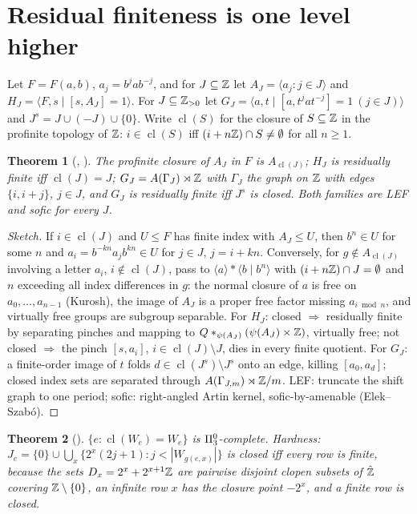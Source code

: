 \documentclass[11pt]{article}
\newtheorem{theorem}{Theorem}[section]
\theoremstyle{definition}
\newcommand{\cl}{\operatorname{cl}}
\begin{document}
\section{Residual finiteness is one level higher}
Let $F=F(a,b)$, $a_j=b^jab^{-j}$, and for $J\subseteq\mathbb Z$ let $A_J=\langle a_j:j\in J\rangle$ and $H_J=\langle F,s\mid [s,A_J]=1\rangle$. For $J\subseteq\mathbb Z_{>0}$ let $G_J=\langle a,t\mid [a,t^jat^{-j}]=1\ (j\in J)\rangle$ and $J^s=J\cup(-J)\cup\{0\}$. Write $\cl(S)$ for the closure of $S\subseteq\mathbb Z$ in the profinite topology of $\mathbb Z$: $i\in\cl(S)$ iff $(i+n\mathbb Z)\cap S\ne\emptyset$ for all $n\ge1$.
\begin{theorem}[, ]\label{thm:crit}
The profinite closure of $A_J$ in $F$ is $A_{\cl(J)}$; $H_J$ is residually finite iff $\cl(J)=J$; $G_J=A(\Gamma_J)\rtimes\mathbb Z$ with $\Gamma_J$ the graph on $\mathbb Z$ with edges $\{i,i+j\}$, $j\in J$, and $G_J$ is residually finite iff $J^s$ is closed. Both families are LEF and sofic for every $J$.
\end{theorem}
\begin{proof}[Sketch]
If $i\in\cl(J)$ and $U\le F$ has finite index with $A_J\le U$, then $b^n\in U$ for some $n$ and $a_i=b^{-kn}a_jb^{kn}\in U$ for $j\in J$, $j=i+kn$. Conversely, for $g\notin A_{\cl(J)}$ involving a letter $a_i$, $i\notin\cl(J)$, pass to $\langle a\rangle*\langle b\mid b^n\rangle$ with $(i+n\mathbb Z)\cap J=\emptyset$ and $n$ exceeding all index differences in $g$: the normal closure of $a$ is free on $a_0,\dots,a_{n-1}$ (Kurosh), the image of $A_J$ is a proper free factor missing $a_{i\bmod n}$, and virtually free groups are subgroup separable. For $H_J$: closed $\Rightarrow$ residually finite by separating pinches and mapping to $Q*_{\psi(A_J)}(\psi(A_J)\times\mathbb Z)$, virtually free; not closed $\Rightarrow$ the pinch $[s,a_i]$, $i\in\cl(J)\setminus J$, dies in every finite quotient. For $G_J$: a finite-order image of $t$ folds $d\in\cl(J^s)\setminus J^s$ onto an edge, killing $[a_0,a_d]$; closed index sets are separated through $A(\Gamma_{J,m})\rtimes\mathbb Z/m$. LEF: truncate the shift graph to one period; sofic: right-angled Artin kernel, sofic-by-amenable (Elek--Szab\'o).
\end{proof}
\begin{theorem}[]
$\{e: \cl(W_e)=W_e\}$ is $\Pi^0_3$-complete. Hardness: $J_e=\{0\}\cup\bigcup_x\{2^x(2j+1): j<|W_{g(e,x)}|\}$ is closed iff every row is finite, because the sets $D_x=2^x+2^{x+1}\mathbb Z$ are pairwise disjoint clopen subsets of $\hat{\mathbb Z}$ covering $\mathbb Z\setminus\{0\}$, an infinite row $x$ has the closure point $-2^x$, and a finite row is closed.
\end{theorem}
\end{document}

